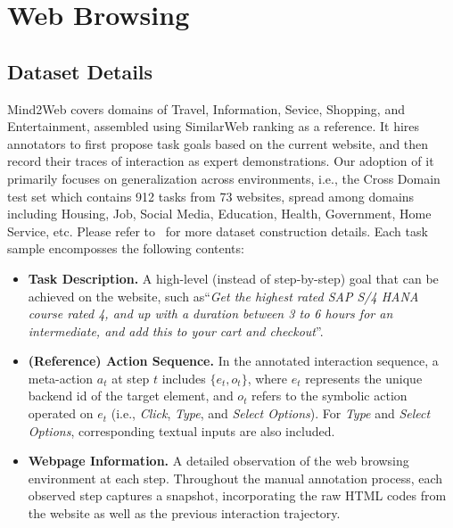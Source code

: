 \section{Web Browsing} \label{app:wb}

\subsection{Dataset Details}
Mind2Web covers domains of Travel, Information, Sevice, Shopping, and Entertainment, assembled using SimilarWeb ranking as a reference. 
It hires annotators to first propose task goals based on the current website, and then record their traces of interaction as expert demonstrations. 
Our adoption of it primarily focuses on generalization across environments, i.e., the Cross Domain test set which contains 912 tasks from 73 websites, spread among domains including Housing, Job, Social Media, Education, Health, Government, Home Service, etc. 
Please refer to~\citep{deng2023mind2web} for more dataset construction details.
Each task sample encomposses the following contents:

\begin{itemize}[leftmargin=1.5em,itemsep=0pt,parsep=0.2em,topsep=0.0em,partopsep=0.0em]
 \item \textbf{Task Description.} A high-level (instead of step-by-step) goal that can be achieved on the website, such as``\textit{Get the highest rated SAP S/4 HANA course rated 4, and up with a duration between 3 to 6 hours for an intermediate, and add this to your cart and checkout}''. 
 
 \item \textbf{(Reference) Action Sequence.} In the annotated interaction sequence, a meta-action $a_t$ at step $t$ includes $\{e_t, o_t\}$, where $e_t$ represents the unique backend id of the target element, and $o_t$ refers to the symbolic action operated on $e_t$ (i.e., \textit{Click}, \textit{Type}, and \textit{Select Options}). 
 For \textit{Type} and \textit{Select Options}, corresponding textual inputs are also included.


\item \textbf{Webpage Information.} A detailed observation of the web browsing environment at each step. 
Throughout the manual annotation process, each observed step captures a snapshot, incorporating the raw HTML codes from the website as well as the previous interaction trajectory.

\end{itemize}

